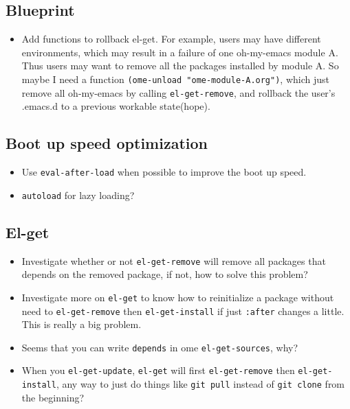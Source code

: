 \documentclass[11pt]{article}
\begin{document}
\subsection*{Blueprint}
\label{sec-5-1}
\begin{itemize}
\item Add functions to rollback el-get. For example, users may have different
environments, which may result in a failure of one oh-my-emacs module A. Thus
users may want to remove all the packages installed by module A. So maybe I
need a function \texttt{(ome-unload "ome-module-A.org")}, which just remove all
oh-my-emacs by calling \texttt{el-get-remove}, and rollback the user's .emacs.d to
a previous workable state(hope).
\end{itemize}

\subsection*{Boot up speed optimization}
\label{sec-5-2}
\begin{itemize}
\item Use \texttt{eval-after-load} when possible to improve the boot up speed.
\item \texttt{autoload} for lazy loading?
\end{itemize}

\subsection*{El-get}
\label{sec-5-3}
\begin{itemize}
\item Investigate whether or not \texttt{el-get-remove} will remove all packages that
depends on the removed package, if not, how to solve this problem?
\item Investigate more on \texttt{el-get} to know how to reinitialize a package without
need to \texttt{el-get-remove} then \texttt{el-get-install} if just \texttt{:after} changes a
little. This is really a big problem.
\item Seems that you can write \texttt{depends} in ome \texttt{el-get-sources}, why?
\item When you \texttt{el-get-update}, \texttt{el-get} will first \texttt{el-get-remove} then
\texttt{el-get-install}, any way to just do things like \texttt{git pull} instead of \texttt{git
  clone} from the beginning?
\end{itemize}
\end{document}
